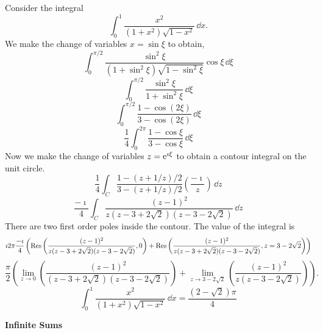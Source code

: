 {%
\begin{Solution}
  \label{solution x^2/((1+x^2)sqrt(1-x^2))}
  Consider the integral
  \[
  \int_0^1 \frac{ x^2 }{ (1+x^2) \sqrt{1-x^2} } \,\dd x.
  \]
  We make the change of variables $x = \sin \xi$ to obtain,
  \[
  \int_0^{\pi/2} \frac{ \sin^2 \xi }{ (1+\sin^2 \xi) \sqrt{1-\sin^2 \xi} }
  \cos \xi \,\dd \xi
  \]
  \[
  \int_0^{\pi/2} \frac{ \sin^2 \xi }{ 1+\sin^2 \xi } \,\dd \xi
  \]
  \[
  \int_0^{\pi/2} \frac{ 1 - \cos (2 \xi) }{ 3 - \cos (2 \xi) } \,\dd \xi
  \]
  \[
  \frac{1}{4} \int_0^{2 \pi} \frac{ 1 - \cos \xi }{ 3 - \cos \xi } \,\dd \xi
  \]
  Now we make the change of variables $z = \mathop{\mathrm{e}}\nolimits^{\imath \xi}$ to obtain a contour
  integral on the unit circle.
  \[
  \frac{1}{4} \int_C \frac{ 1 - ( z + 1/z )/2 }{ 3 - ( z + 1/z )/2 } 
  \left( \frac{-\imath}{z} \right) \,\dd z
  \]
  \[
  \frac{-\imath}{4} \int_C \frac{ (z-1)^2 } 
  { z ( z - 3 + 2 \sqrt{2} ) ( z - 3 - 2 \sqrt{2} ) } \,\dd z
  \]
  There are two first order poles inside the contour.  The value of the 
  integral is
  \[
  \imath 2 \pi \frac{-\imath}{4} \left(
    \mathop{\mathrm{Res}}\nolimits \left( \frac{ (z-1)^2 }
      { z ( z - 3 + 2 \sqrt{2} ) ( z - 3 - 2 \sqrt{2} ) }, 0 \right) 
    + \mathop{\mathrm{Res}}\nolimits \left( \frac{ (z-1)^2 }
      { z ( z - 3 + 2 \sqrt{2} ) ( z - 3 - 2 \sqrt{2} ) }, 
      z = 3 - 2 \sqrt{2}  \right) \right)
  \]
  \[
  \frac{\pi}{2} \left(
    \lim_{z \to 0} 
    \left( \frac{ (z-1)^2 } { ( z - 3 + 2 \sqrt{2} ) ( z - 3 - 2 \sqrt{2} )}\right)
    + \lim_{z \to 3 - 2 \sqrt{2} }
    \left( \frac{ (z-1)^2 } { z ( z - 3 - 2 \sqrt{2} ) } \right) \right).
  \]
  \[
  \boxed{
    \int_0^1 \frac{ x^2 }{ (1+x^2) \sqrt{1-x^2} } \,\dd x
    = \frac{ (2 - \sqrt{2}) \pi }{ 4 }
    }
  \]
\end{Solution}



\begin{large}
  \noindent
  \textbf{Infinite Sums}
\end{large}



}
